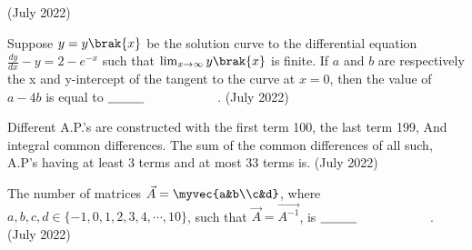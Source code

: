  \hfill{(July 2022)} 
 \item Suppose $y=y\brak{x}$ be the solution curve to the differential equation $\frac{dy}{dx}-y=2-e^{-x}$ such that $\lim_{x \to \infty} y\brak{x}$ is finite. If $a$ and $b$ are respectively the x and y-intercept of the tangent to the curve at $x=0$, then the value of $a-4b$ is equal to $\makebox[3cm][l]{\underline{\hspace{1cm}}}$.
 \hfill{(July 2022)} 
 \item Different A.P.'s are constructed with the first term 100, the last term 199, And integral common differences. The sum of the common differences of all such, A.P's having at least 3 terms and at most 33 terms is.
 \hfill{(July 2022)} 
 \item The number of matrices $\vec{A}=\myvec{a&b\\c&d}$, where $a,b,c,d \in\{-1,0,1,2,3,4,\cdots,10\}$, such that $\vec{A}=\vec{A^{-1}}$, is $\makebox[3cm][l]{\underline{\hspace{1cm}}}$.
 \hfill{(July 2022)} 

